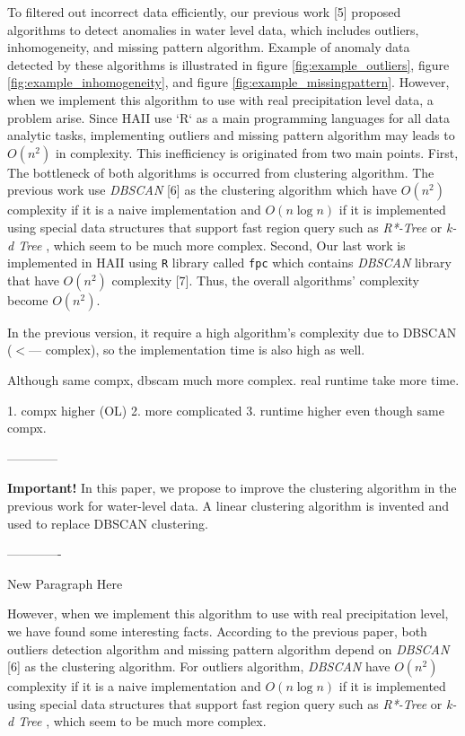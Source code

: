 \documentclass[conference]{IEEEtran}
\begin{document}
To filtered out incorrect data efficiently, our previous work [5] proposed algorithms to detect anomalies in water level data, which includes outliers, inhomogeneity, and missing pattern algorithm. Example of anomaly data detected by these algorithms is illustrated in figure \ref{fig:example_outliers}, figure \ref{fig:example_inhomogeneity}, and figure \ref{fig:example_missingpattern}. {\color{red} However, when we implement this algorithm to use with real precipitation level data, a problem arise. Since HAII use `R` as a main programming languages for all data analytic tasks, implementing outliers and missing pattern algorithm may leads to $O(n^2)$ in complexity. This inefficiency is originated from two main points. First, The bottleneck of both algorithms is occurred from clustering algorithm. The previous work use \textit{DBSCAN} [6] as the clustering algorithm which have $O(n^2)$ complexity if it is a naive implementation and $O(n\log{n})$ if it is implemented using special data structures that support fast region query such as \textit{R*-Tree} or \textit{k-d Tree} , which seem to be much more complex. Second, Our last work is implemented in HAII using \texttt{R} library called \texttt{fpc} which contains \textit{DBSCAN} library that have $O(n^2)$ complexity [7]. Thus, the overall algorithms’ complexity become $O(n^2)$.}

In the previous version, it require a high algorithm's complexity due to DBSCAN ($<$--- complex), so the implementation time is also high as well.

Although same compx, dbscam much more complex. real runtime take more time.

1. compx higher (OL)
2. more complicated
3. runtime higher even though same compx.

------------

\textbf{\color{red} Important!}
In this paper, we propose to improve the clustering algorithm in the previous work for water-level data. A linear clustering algorithm is invented and used to replace DBSCAN clustering.

-------------

{\color{blue}
	New Paragraph Here
	
	However, when we implement this algorithm to use with real precipitation level, we have found some interesting facts. According to the previous paper, both outliers detection algorithm and missing pattern algorithm depend on \textit{DBSCAN} [6] as the clustering algorithm. For outliers algorithm, \textit{DBSCAN} have $O(n^2)$ complexity if it is a naive implementation and $O(n\log{n})$ if it is implemented using special data structures that support fast region query such as \textit{R*-Tree} or \textit{k-d Tree} , which seem to be much more complex. 
}	
\end{document}
